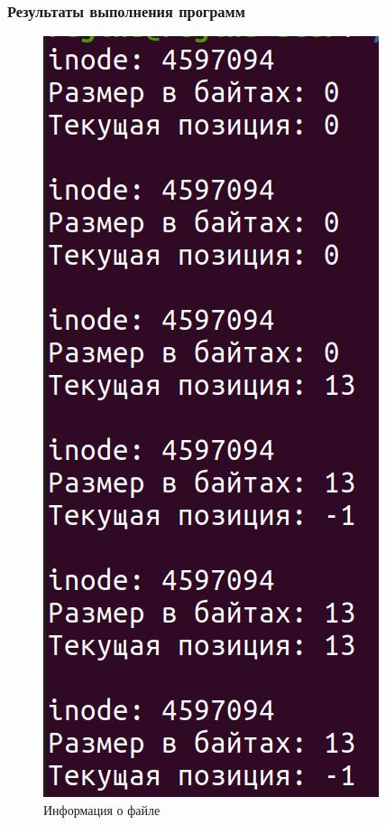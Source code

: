 \subsubsection{Результаты выполнения программ}

\begin{figure}[H]
	\begin{center}
		\includegraphics[scale=0.3]{img/info.png}
	\end{center}
	\captionsetup{justification=centering}
	\caption{Информация о файле}
	\label{img:info}
\end{figure}

